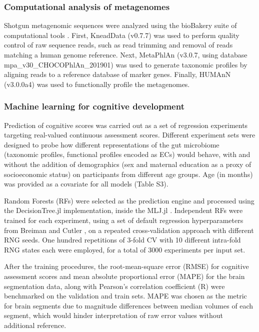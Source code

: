 \documentclass{article}
\begin{document}
\subsubsection*{Computational analysis of metagenomes}

Shotgun metagenomic sequences were analyzed using the bioBakery suite of
computational tools \cite{beghiniIntegratingTaxonomicFunctional2021}.
First, KneadData (v0.7.7) was used to perform quality
control of raw sequence reads, such as read trimming and removal of
reads matching a human genome reference. Next, MetaPhlAn (v3.0.7, using
database mpa\_v30\_CHOCOPhlAn\_201901) was used to generate taxonomic
profiles by aligning reads to a reference database of marker genes.
Finally, HUMAnN (v3.0.0a4) was used to functionally profile the
metagenomes.

\subsubsection*{Machine learning for cognitive development}

Prediction of cognitive scores was carried out as a set of regression
experiments targeting real-valued continuous assessment scores.
Different experiment sets were designed to probe how different
representations of the gut microbiome (taxonomic profiles, functional
profiles encoded as ECs) would behave, with and without the addition of
demographics (sex and maternal education as a proxy of socioeconomic
status) on participants from different age groups. Age (in months) was
provided as a covariate for all models (Table S3).

Random Forests (RFs)
\cite{breimanRandomForests2001}
were selected as the prediction engine and processed using the
DecisionTree.jl \cite{sadeghiDecisionTreeJlJulia2022}
implementation, inside the MLJ.jl \cite{blaomMLJJuliaPackage2020}.
Independent RFs were trained for each
experiment, using a set of default regression hyperparameters from
Breiman and Cutler \cite{breimanRandomForests2001},
on a repeated cross-validation approach with different RNG seeds. One hundred
repetitions of 3-fold CV with 10 different intra-fold RNG states each
were employed, for a total of 3000 experiments per input set.

After the training procedures, the root-mean-square error (RMSE) for
cognitive assessment scores and mean absolute proportional error (MAPE)
for the brain segmentation data, along with Pearson's
correlation coefficient (R) were benchmarked on the validation and train
sets. MAPE was chosen as the metric for brain segments due to magnitude
differences between median volumes of each segment, which would hinder
interpretation of raw error values without additional reference.
\end{document}
